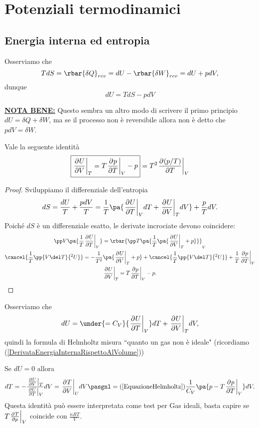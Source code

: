 \section{Potenziali termodinamici}
\subsection{Energia interna ed entropia}

\begin{remark}[Differenziali]
Osserviamo che
\[TdS=\rbar{\delta Q}_{rev}=dU-\rbar{\delta W}_{rev}=dU+pdV,\]
dunque
\[\boxed{dU=TdS-pdV}\]
\end{remark}
\begin{remark}
\underline{\textbf{NOTA BENE:}} Questo sembra un altro modo di scrivere il primo principio $dU=\delta Q+\delta W$, ma se il processo non \`e reversibile allora non \`e detto che $pdV=\delta W$.
\end{remark}

\begin{proposition}\label{EquazioneHelmholtz}
Vale la seguente identit\`a
\[\boxed{\ppb VUT=T\ppb TpV-p}=T^2\ppb T{(p/T)}V\]
\end{proposition}
\begin{proof}
Sviluppiamo il differenziale dell'entropia
\[dS=\frac{dU}T+\frac{pdV}T=\frac1T\pa{\ppb TUVdT+\ppb VUTdV}+\frac pTdV.\]
Poich\'e $dS$ \`e un differenziale esatto, le derivate incrociate devono coincidere:
\begin{gather*}
\pp V{}\pa{\frac1T\ppb TUV}=\rbar{\pp T{}\pa{\frac1T\pa{\ppb VUT+p}}}_V\\
\cancel{\frac1T\pp{V\del T}{^2U}}=-\frac1{T^2}\pa{\ppb VUT+p}+\cancel{\frac1T\pp{V\del T}{^2U}}+\frac1T\ppb TpV\\
\ppb VUT=T\ppb TpV-p.
\end{gather*}
\end{proof}
\begin{remark}
Osserviamo che 
\[dU=\under{=C_V}{\ppb TUV}dT+\ppb VUTdV,\]
quindi la formula di Helmholtz misura ``quanto un gas non \`e ideale" (ricordiamo (\ref{DerivataEnergiaInternaRispettoAlVolume}))
\end{remark}
\begin{remark}
Se $dU=0$ allora
\[dT=-\frac{\ppb VUT}{\ppb TUV}dV=\ppb VTUdV\pasgnl={(\ref{EquazioneHelmholtz})}\frac1{C_V}\pa{p-T\ppb TpV}dV.\]
Questa identit\`a pu\`o essere interpretata come test per Gas ideali, basta capire se $T\ppb pTV$ coincide con $\frac{nRT}V$.
\end{remark}

